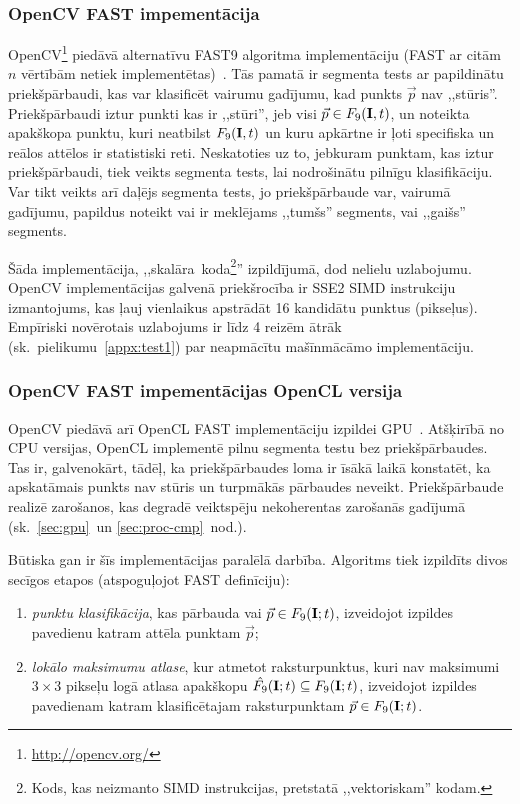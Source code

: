 \subsubsection{OpenCV FAST impementācija} \label{sec:fast-ocv}
OpenCV\footnote{\url{http://opencv.org/}} piedāvā alternatīvu FAST9 algoritma
implementāciju (FAST ar citām $n$ vērtībām netiek implementētas)~\cite{OpenCV-src}.
Tās pamatā ir segmenta tests ar papildinātu
priekšpārbaudi\cite{Rosten-tracking}\cite{FAST}, kas var klasificēt vairumu
gadījumu, kad punkts $\vec{p}$ nav ,,stūris''. Priekšpārbaudi iztur
punkti kas ir ,,stūri'', jeb visi $\vec{p} \in F_9(\mathbf{I}, t)$,
un noteikta apakškopa punktu, kuri neatbilst $F_9(\mathbf{I}, t)$ un kuru
apkārtne ir ļoti specifiska un reālos attēlos ir statistiski reti.
Neskatoties
uz to, jebkuram punktam, kas iztur priekšpārbaudi, tiek veikts segmenta
tests, lai nodrošinātu pilnīgu klasifikāciju.
Var tikt veikts arī daļējs segmenta tests, jo priekšpārbaude var,
vairumā gadījumu, papildus noteikt vai ir meklējams ,,tumšs'' segments, vai
,,gaišs'' segments.

Šāda implementācija, ,,skalāra~koda\footnote{Kods, kas neizmanto SIMD
	instrukcijas, pretstatā ,,vektoriskam'' kodam.}''
izpildījumā, dod nelielu uzlabojumu. OpenCV implementācijas galvenā
priekšrocība ir SSE2 SIMD instrukciju izmantojums, kas ļauj vienlaikus
apstrādāt 16 kandidātu punktus (pikseļus). Empīriski novērotais
uzlabojums ir līdz 4 reizēm ātrāk (sk.~pielikumu~\ref{appx:test1})
par neapmācītu mašīnmācāmo implementāciju.

\subsubsection{OpenCV FAST impementācijas OpenCL versija}
OpenCV piedāvā arī OpenCL FAST implementāciju izpildei GPU~\cite{OpenCV-src}.
Atšķirībā no CPU versijas, OpenCL implementē pilnu segmenta testu bez
priekšpārbaudes. Tas ir, galvenokārt, tādēļ, ka priekšpārbaudes loma ir
īsākā laikā konstatēt, ka apskatāmais punkts nav stūris un turpmākās pārbaudes
neveikt. Priekšpārbaude realizē zarošanos, kas degradē veiktspēju
nekoherentas zarošanās gadījumā (sk.~\ref{sec:gpu}~un \ref{sec:proc-cmp}~nod.).

Būtiska gan ir šīs implementācijas paralēlā darbība. Algoritms tiek
izpildīts divos secīgos etapos (atspoguļojot FAST definīciju):
\begin{enumerate}
	\item \emph{punktu klasifikācija}, kas pārbauda vai
		$\vec{p} \in F_9(\mathbf{I}; t)$, izveidojot izpildes pavedienu katram
		attēla punktam $\vec{p}$;
	\item \emph{lokālo maksimumu atlase}, kur atmetot raksturpunktus,
		kuri nav maksimumi $3 \times 3$ pikseļu logā atlasa apakškopu
		$\hat{F_9}(\mathbf{I}; t) \subseteq F_9(\mathbf{I}; t)$, izveidojot
		izpildes pavedienam katram klasificētajam raksturpunktam
		$\vec{p} \in F_9(\mathbf{I}; t)$.
\end{enumerate}

